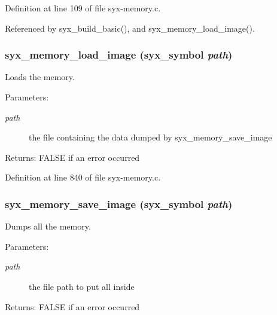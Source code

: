 Definition at line 109 of file syx-memory.c.

Referenced by syx\_\-build\_\-basic(), and syx\_\-memory\_\-load\_\-image().\hypertarget{syx-memory_8c_6a35f8cdd18f1615df7de7ac81911c95}{
\subsubsection{ syx\_\-memory\_\-load\_\-image ({\bf syx\_\-symbol} {\em path})}}
\label{syx-memory_8c_6a35f8cdd18f1615df7de7ac81911c95}


Loads the memory.

\begin{Desc}
\item[Parameters:]
\begin{description}
\item[{\em path}]the file containing the data dumped by syx\_\-memory\_\-save\_\-image \end{description}
\end{Desc}
\begin{Desc}
\item[Returns:]FALSE if an error occurred \end{Desc}


Definition at line 840 of file syx-memory.c.\hypertarget{syx-memory_8c_693fc1a91ed11515e100275d7f99b413}{
\subsubsection{ syx\_\-memory\_\-save\_\-image ({\bf syx\_\-symbol} {\em path})}}
\label{syx-memory_8c_693fc1a91ed11515e100275d7f99b413}


Dumps all the memory.

\begin{Desc}
\item[Parameters:]
\begin{description}
\item[{\em path}]the file path to put all inside \end{description}
\end{Desc}
\begin{Desc}
\item[Returns:]FALSE if an error occurred \end{Desc}


